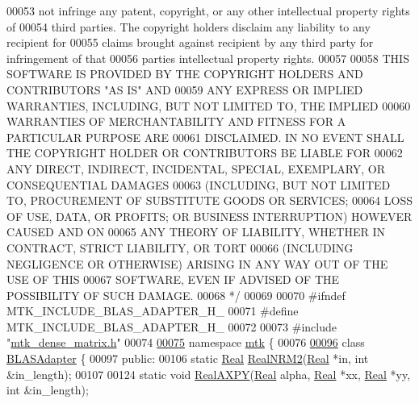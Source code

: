 \begin{DoxyCode}
00053 \textcolor{comment}{not infringe any patent, copyright, or any other intellectual property rights of}
00054 \textcolor{comment}{third parties. The copyright holders disclaim any liability to any recipient for}
00055 \textcolor{comment}{claims brought against recipient by any third party for infringement of that}
00056 \textcolor{comment}{parties intellectual property rights.}
00057 \textcolor{comment}{}
00058 \textcolor{comment}{THIS SOFTWARE IS PROVIDED BY THE COPYRIGHT HOLDERS AND CONTRIBUTORS "AS IS" AND}
00059 \textcolor{comment}{ANY EXPRESS OR IMPLIED WARRANTIES, INCLUDING, BUT NOT LIMITED TO, THE IMPLIED}
00060 \textcolor{comment}{WARRANTIES OF MERCHANTABILITY AND FITNESS FOR A PARTICULAR PURPOSE ARE}
00061 \textcolor{comment}{DISCLAIMED. IN NO EVENT SHALL THE COPYRIGHT HOLDER OR CONTRIBUTORS BE LIABLE FOR}
00062 \textcolor{comment}{ANY DIRECT, INDIRECT, INCIDENTAL, SPECIAL, EXEMPLARY, OR CONSEQUENTIAL DAMAGES}
00063 \textcolor{comment}{(INCLUDING, BUT NOT LIMITED TO, PROCUREMENT OF SUBSTITUTE GOODS OR SERVICES;}
00064 \textcolor{comment}{LOSS OF USE, DATA, OR PROFITS; OR BUSINESS INTERRUPTION) HOWEVER CAUSED AND ON}
00065 \textcolor{comment}{ANY THEORY OF LIABILITY, WHETHER IN CONTRACT, STRICT LIABILITY, OR TORT}
00066 \textcolor{comment}{(INCLUDING NEGLIGENCE OR OTHERWISE) ARISING IN ANY WAY OUT OF THE USE OF THIS}
00067 \textcolor{comment}{SOFTWARE, EVEN IF ADVISED OF THE POSSIBILITY OF SUCH DAMAGE.}
00068 \textcolor{comment}{*/}
00069 
00070 \textcolor{preprocessor}{#ifndef MTK\_INCLUDE\_BLAS\_ADAPTER\_H\_}
00071 \textcolor{preprocessor}{#define MTK\_INCLUDE\_BLAS\_ADAPTER\_H\_}
00072 
00073 \textcolor{preprocessor}{#include "\hyperlink{mtk__dense__matrix_8h}{mtk\_dense\_matrix.h}"}
00074 
\hypertarget{mtk__blas__adapter_8h_source_l00075}{}\hyperlink{namespacemtk}{00075} \textcolor{keyword}{namespace }\hyperlink{namespacemtk}{mtk} \{
00076 
\hypertarget{mtk__blas__adapter_8h_source_l00096}{}\hyperlink{classmtk_1_1BLASAdapter}{00096} \textcolor{keyword}{class }\hyperlink{classmtk_1_1BLASAdapter}{BLASAdapter} \{
00097  \textcolor{keyword}{public}:
00106   \textcolor{keyword}{static} \hyperlink{group__c01-roots_gac080bbbf5cbb5502c9f00405f894857d}{Real} \hyperlink{classmtk_1_1BLASAdapter_ab92440888b730863244c5d9479c11aca}{RealNRM2}(\hyperlink{group__c01-roots_gac080bbbf5cbb5502c9f00405f894857d}{Real} *in, \textcolor{keywordtype}{int} &in\_length);
00107 
00124   \textcolor{keyword}{static} \textcolor{keywordtype}{void} \hyperlink{classmtk_1_1BLASAdapter_a081cd092ae65e730f44eae8643edd539}{RealAXPY}(\hyperlink{group__c01-roots_gac080bbbf5cbb5502c9f00405f894857d}{Real} alpha, \hyperlink{group__c01-roots_gac080bbbf5cbb5502c9f00405f894857d}{Real} *xx, \hyperlink{group__c01-roots_gac080bbbf5cbb5502c9f00405f894857d}{Real} *yy, \textcolor{keywordtype}{int} &in\_length);

\end{DoxyCode}
